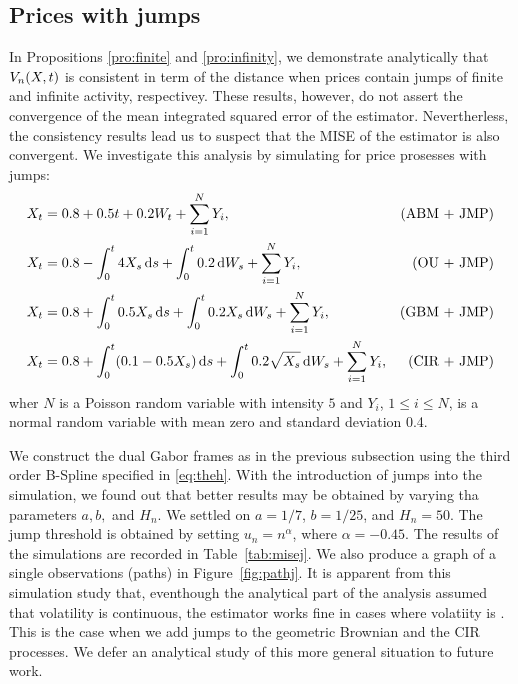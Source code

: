  \subsection{Prices with jumps}
 In Propositions \eqref{pro:finite} and \eqref{pro:infinity}, we demonstrate analytically that $V_n(X, t)$ is consistent in term of the \Ltwo distance when prices contain jumps of finite and infinite activity, respectivey. These results, however, do not assert the convergence of the mean integrated squared error of the estimator. Nevertherless, the consistency results lead us to suspect that the MISE of the estimator is also convergent. We investigate this analysis by simulating for price prosesses with jumps:    
\begin{align}
  & X_t = 0.8 +  0.5  t + 0.2  W_t + \sum_{i = 1}^N Y_i,\notag & \text{(ABM + JMP)}\\
  & X_t = 0.8 -\int_0^t 4 X_s \D s + \int^t_0 0.2 \D W_s +  \sum_{i = 1}^N Y_i ,\notag & \text{(OU + JMP)}\\
  & X_t = 0.8 + \int_0^t 0.5 X_s \D s + \int^t_0 0.2 X_s \D W_s + \sum_{i = 1}^N Y_i,\notag & \text{(GBM + JMP)}\\
  & X_t = 0.8 + \int_0^t(0.1 - 0.5 X_s) \D s +\int^t_0  0.2 \sqrt{X_s} \D W_s + \sum_{i = 1}^N Y_i,\notag & \text{(CIR + JMP)}
  \label{}
\end{align}
wher $N$ is a Poisson random variable with intensity $5$ and $Y_i$, $1 \le  i\le N$, is a normal random variable with mean zero and standard deviation 0.4.  

We construct the dual  Gabor frames as in the previous subsection using the  third order B-Spline specified in \eqref{eq:theh}. With the introduction of jumps into the simulation, we found out that better results may be obtained by varying tha parameters $a,b,$ and $H_n$. We settled on $a = 1/7$, $b = 1/25$, and $H_n = 50$. The jump threshold is obtained by setting $u_n = n^{\alpha}$, where $\alpha = -0.45$. The results of the simulations are recorded in Table~\ref{tab:misej}. We also produce a graph of a single observations (paths) in Figure~\ref{fig:pathj}. It is apparent from this simulation study that, eventhough the analytical part of the analysis assumed that volatility is continuous, the estimator \jvn works fine in cases where volatiity is \cadlag. This is the case when we add jumps to the geometric Brownian  and the CIR processes. We defer an analytical study of this more general situation to future work.


